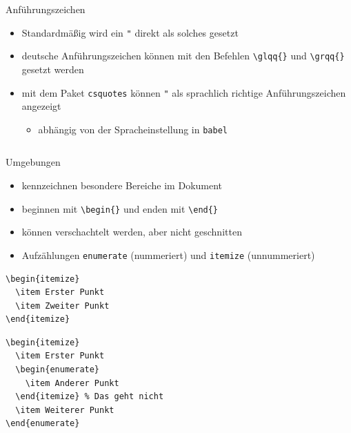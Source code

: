 \documentclass[presentation,aspectratio=169]{beamer}
\begin{document}
\begin{frame}[fragile]{Anführungszeichen}
  \begin{itemize}
    \item Standardmäßig wird ein \verb|"| direkt als solches gesetzt
    \item deutsche Anführungszeichen können mit den Befehlen \verb|\glqq{}| und \verb|\grqq{}| gesetzt werden
    \item mit dem Paket \verb|csquotes| können \verb|"| als sprachlich richtige Anführungszeichen angezeigt
      \begin{itemize}
        \item abhängig von der Spracheinstellung in \verb|babel|
      \end{itemize}
    \inputminted{latex}{codebeispiele/quotation.tex}
  \end{itemize}
\end{frame}

\begin{frame}[fragile]{Umgebungen}
  \begin{itemize}
    \item kennzeichnen besondere Bereiche im Dokument
    \item beginnen mit \verb|\begin{}| und enden mit \verb|\end{}|
    \item können verschachtelt werden, aber nicht geschnitten
    \item Aufzählungen \verb|enumerate| (nummeriert) und \verb|itemize| (unnummeriert)
  \end{itemize}
  \begin{minipage}{.4\textwidth}
    \centering
    \begin{verbatim}
\begin{itemize}
  \item Erster Punkt
  \item Zweiter Punkt
\end{itemize}
    \end{verbatim}
  \end{minipage}
  \begin{minipage}{.4\textwidth}
    \centering
    \begin{verbatim}
\begin{itemize}
  \item Erster Punkt
  \begin{enumerate}
    \item Anderer Punkt
  \end{itemize} % Das geht nicht
  \item Weiterer Punkt
\end{enumerate}
    \end{verbatim}
  \end{minipage}
\end{frame}
\end{document}
